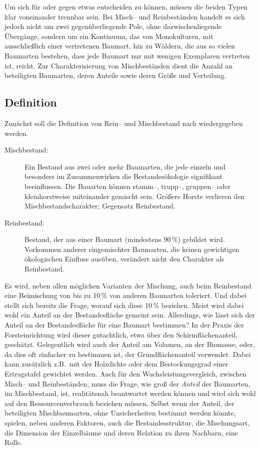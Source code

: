 \documentclass[twocolumn]{scrartcl}
\begin{document}
Um sich für oder gegen etwas entscheiden zu können, müssen die beiden Typen klar
voneinander trennbar sein. Bei Misch-- und Reinbeständen handelt es sich jedoch
nicht um zwei gegenüberliegende Pole, ohne dazwischenliegende Übergänge, sondern
um ein Kontinuum, das von Monokulturen, mit ausschließlich einer vertretenen
Baumart, hin zu Wäldern, die aus so vielen Baumarten bestehen, dass jede Baumart
nur mit wenigen Exemplaren vertreten ist, reicht. Zur Charakterisierung von
Mischbeständen dient die Anzahl an beteiligten Baumarten, deren Anteile sowie
deren Größe und Verteilung.

\subsection{Definition}
\label{ssec:definition}

Zunächst soll die Definition von Rein-- und Mischbestand nach
\cite{bruenig1980WaldbaulicheTerminologi} wiedergegeben werden.
\begin{description}
\item[Mischbestand:] Ein Bestand aus zwei oder
  mehr Baumarten, die jede einzeln und besonders im Zusammenwirken die
  Bestandesökologie signifikant beeinflussen. Die Bauarten können stamm--,
  trupp--, gruppen-- oder kleinhorstweise miteinander gemischt sein. Größere
  Horste verlieren den Mischbestandscharakter; Gegensatz Reinbestand.
\item[Reinbestand:] Bestand, der aus einer
  Baumart (mindestens 90\,\%) gebildet wird. Vorkommen anderer eingemischter
  Baumarten, die keinen gewichtigen ökologischen Einfluss ausüben, verändert
  nicht den Charakter als Reinbestand.
\end{description}

Es wird, neben allen möglichen Varianten der Mischung, auch beim Reinbestand
eine Beimischung von bis zu 10\,\% von anderen Baumarten toleriert. Und dabei
stellt sich bereits die Frage, worauf sich diese 10\,\% beziehen. Meist wird
dabei wohl ein Anteil an der Bestandesfläche gemeint sein. Allerdings, wie lässt
sich der Anteil an der Bestandesfläche für eine Baumart bestimmen? In der Praxis
der Forsteinrichtung wird dieser gutachtlich, etwa über den Schirmflächenanteil,
geschätzt. Gelegentlich wird auch der Anteil am Volumen, an der Biomasse, oder,
da dies oft einfacher zu bestimmen ist, der Grundflächenanteil verwendet. Dabei
kann zusätzlich z.B.\ mit der Holzdichte oder dem Bestockungsgrad einer
Ertragstafel gewichtet werden. Auch für den Wuchsleistungsvergleich, zwischen
Misch-- und Reinbeständen, muss die Frage, wie groß der \emph{Anteil} der
Baumarten, im Mischbestand, ist, realitätsnah beantwortet werden können und wird
sich wohl auf den Ressourcenverbrauch beziehen müssen. Selbst wenn der Anteil,
der beteiligten Mischbaumarten, ohne Unsicherheiten bestimmt werden könnte,
spielen, neben anderen Faktoren, auch die Bestandesstruktur, die Mischungsart,
die Dimension der Einzelbäume und deren Relation zu ihren Nachbarn, eine Rolle.
\end{document}
